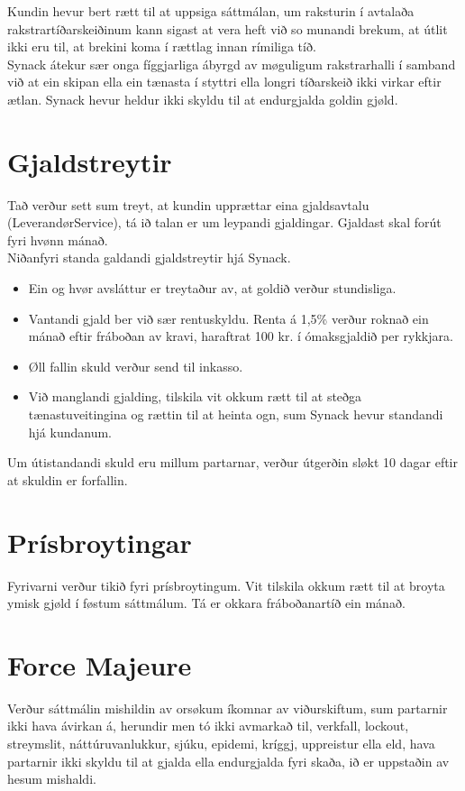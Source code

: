 \noindent
Kundin hevur bert rætt til at uppsiga sáttmálan, um raksturin í avtalaða rakstrartíðarskeiðinum kann
sigast at vera heft við so munandi brekum, at útlit ikki eru til, at brekini koma í rættlag innan rímiliga
tíð. \\

\noindent
Synack átekur sær onga fíggjarliga ábyrgd av møguligum rakstrarhalli í samband við at ein skipan ella
ein tænasta í styttri ella longri tíðarskeið ikki virkar eftir ætlan. Synack hevur heldur ikki skyldu til at
endurgjalda goldin gjøld.

\newpage
\section*{Gjaldstreytir}
Tað verður sett sum treyt, at kundin upprættar eina gjaldsavtalu (LeverandørService), tá ið talan er
um leypandi gjaldingar. Gjaldast skal forút fyri hvønn mánað. \\

\noindent
Niðanfyri standa galdandi gjaldstreytir hjá Synack.
\begin{itemize}
	\item Ein og hvør avsláttur er treytaður av, at goldið verður stundisliga.
	\item Vantandi gjald ber við sær rentuskyldu. Renta á 1,5\% verður roknað ein mánað eftir
	fráboðan av kravi, haraftrat 100 kr. í ómaksgjaldið per rykkjara.
	\item Øll fallin skuld verður send til inkasso.
	\item Við manglandi gjalding, tilskila vit okkum rætt til at steðga tænastuveitingina og rættin til at
	heinta ogn, sum Synack hevur standandi hjá kundanum.
\end{itemize}
Um útistandandi skuld eru millum partarnar, verður útgerðin sløkt 10 dagar eftir at skuldin er
forfallin.

\section*{Prísbroytingar}
Fyrivarni verður tikið fyri prísbroytingum. Vit tilskila okkum rætt til at broyta ymisk gjøld í føstum
sáttmálum. Tá er okkara fráboðanartíð ein mánað.

\section*{Force Majeure}
Verður sáttmálin mishildin av orsøkum íkomnar av viðurskiftum, sum partarnir ikki hava ávirkan á,
herundir men tó ikki avmarkað til, verkfall, lockout, streymslit, náttúruvanlukkur, sjúku, epidemi,
kríggj, uppreistur ella eld, hava partarnir ikki skyldu til at gjalda ella endurgjalda fyri skaða, ið er
uppstaðin av hesum mishaldi.

